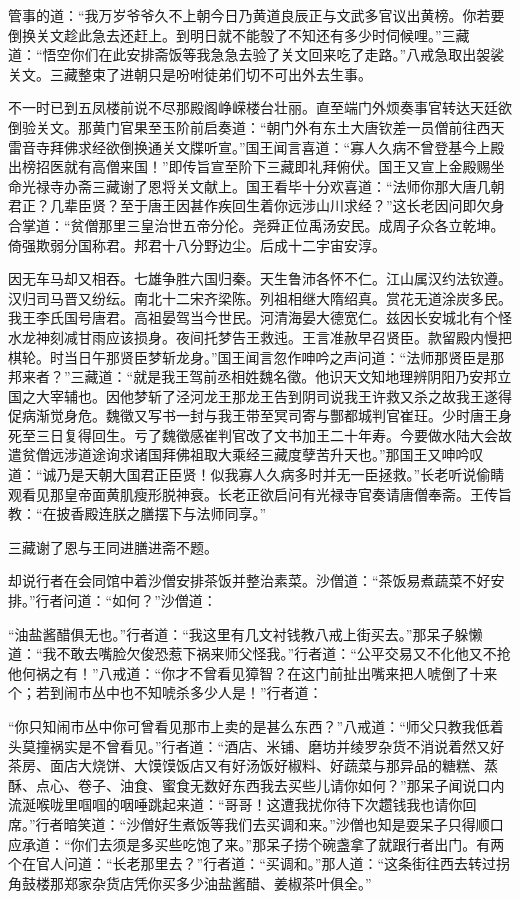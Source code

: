 \documentclass[12pt,UTF8]{ctexbook}
\begin{document}
管事的道：“我万岁爷爷久不上朝今日乃黄道良辰正与文武多官议出黄榜。你若要倒换关文趁此急去还赶上。到明日就不能彀了不知还有多少时伺候哩。”三藏道：“悟空你们在此安排斋饭等我急急去验了关文回来吃了走路。”八戒急取出袈裟关文。三藏整束了进朝只是吩咐徒弟们切不可出外去生事。

不一时已到五凤楼前说不尽那殿阁峥嵘楼台壮丽。直至端门外烦奏事官转达天廷欲倒验关文。那黄门官果至玉阶前启奏道：“朝门外有东土大唐钦差一员僧前往西天雷音寺拜佛求经欲倒换通关文牒听宣。”国王闻言喜道：“寡人久病不曾登基今上殿出榜招医就有高僧来国！”即传旨宣至阶下三藏即礼拜俯伏。国王又宣上金殿赐坐命光禄寺办斋三藏谢了恩将关文献上。国王看毕十分欢喜道：“法师你那大唐几朝君正？几辈臣贤？至于唐王因甚作疾回生着你远涉山川求经？”这长老因问即欠身合掌道：“贫僧那里三皇治世五帝分伦。尧舜正位禹汤安民。成周子众各立乾坤。倚强欺弱分国称君。邦君十八分野边尘。后成十二宇宙安淳。

因无车马却又相吞。七雄争胜六国归秦。天生鲁沛各怀不仁。江山属汉约法钦遵。汉归司马晋又纷纭。南北十二宋齐梁陈。列祖相继大隋绍真。赏花无道涂炭多民。我王李氏国号唐君。高祖晏驾当今世民。河清海晏大德宽仁。兹因长安城北有个怪水龙神刻减甘雨应该损身。夜间托梦告王救迍。王言准赦早召贤臣。款留殿内慢把棋轮。时当日午那贤臣梦斩龙身。”国王闻言忽作呻吟之声问道：“法师那贤臣是那邦来者？”三藏道：“就是我王驾前丞相姓魏名徵。他识天文知地理辨阴阳乃安邦立国之大宰辅也。因他梦斩了泾河龙王那龙王告到阴司说我王许救又杀之故我王遂得促病渐觉身危。魏徵又写书一封与我王带至冥司寄与酆都城判官崔玨。少时唐王身死至三日复得回生。亏了魏徵感崔判官改了文书加王二十年寿。今要做水陆大会故遣贫僧远涉道途询求诸国拜佛祖取大乘经三藏度孽苦升天也。”那国王又呻吟叹道：“诚乃是天朝大国君正臣贤！似我寡人久病多时并无一臣拯救。”长老听说偷睛观看见那皇帝面黄肌瘦形脱神衰。长老正欲启问有光禄寺官奏请唐僧奉斋。王传旨教：“在披香殿连朕之膳摆下与法师同享。”

三藏谢了恩与王同进膳进斋不题。

却说行者在会同馆中着沙僧安排茶饭并整治素菜。沙僧道：“茶饭易煮蔬菜不好安排。”行者问道：“如何？”沙僧道：

“油盐酱醋俱无也。”行者道：“我这里有几文衬钱教八戒上街买去。”那呆子躲懒道：“我不敢去嘴脸欠俊恐惹下祸来师父怪我。”行者道：“公平交易又不化他又不抢他何祸之有！”八戒道：“你才不曾看见獐智？在这门前扯出嘴来把人唬倒了十来个；若到闹市丛中也不知唬杀多少人是！”行者道：

“你只知闹市丛中你可曾看见那市上卖的是甚么东西？”八戒道：“师父只教我低着头莫撞祸实是不曾看见。”行者道：“酒店、米铺、磨坊并绫罗杂货不消说着然又好茶房、面店大烧饼、大馍馍饭店又有好汤饭好椒料、好蔬菜与那异品的糖糕、蒸酥、点心、卷子、油食、蜜食无数好东西我去买些儿请你如何？”那呆子闻说口内流涎喉咙里啯啯的咽唾跳起来道：“哥哥！这遭我扰你待下次趱钱我也请你回席。”行者暗笑道：“沙僧好生煮饭等我们去买调和来。”沙僧也知是耍呆子只得顺口应承道：“你们去须是多买些吃饱了来。”那呆子捞个碗盏拿了就跟行者出门。有两个在官人问道：“长老那里去？”行者道：“买调和。”那人道：“这条街往西去转过拐角鼓楼那郑家杂货店凭你买多少油盐酱醋、姜椒茶叶俱全。”
\end{document}
